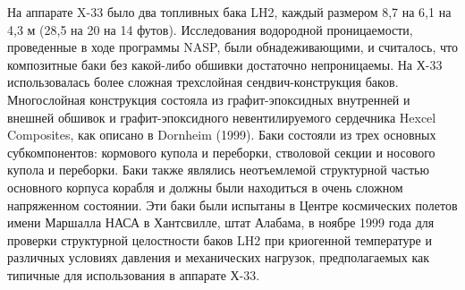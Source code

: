 На аппарате X-33 было два топливных бака LH2, каждый размером 8,7 на 6,1 на 4,3 м (28,5 на 20 на 14 футов). Исследования водородной проницаемости, проведенные в ходе программы NASP, были обнадеживающими, и считалось, что композитные баки без какой-либо обшивки достаточно непроницаемы. На Х-33 использовалась более сложная трехслойная сендвич-конструкция баков. Многослойная конструкция состояла из графит-эпоксидных внутренней и внешней обшивок и графит-эпоксидного невентилируемого сердечника Hexcel Composites, как описано в Dornheim (1999). Баки состояли из трех основных субкомпонентов: кормового купола и переборки, стволовой секции и носового купола и переборки. Баки также являлись неотъемлемой структурной частью основного корпуса корабля и должны были находиться в очень сложном напряженном состоянии. Эти баки были испытаны в Центре космических полетов имени Маршалла НАСА в Хантсвилле, штат Алабама, в ноябре 1999 года для проверки структурной целостности баков LH2 при криогенной температуре и различных условиях давления и механических нагрузок, предполагаемых как типичные для использования в аппарате Х-33. 